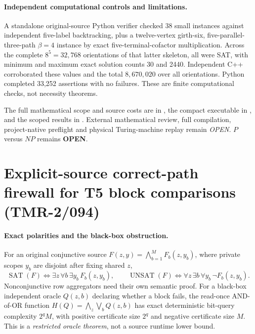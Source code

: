 \documentclass[11pt]{article}
\begin{document}
\paragraph{Independent computational controls and limitations.}
A standalone original-source Python verifier checked 38 small
instances against independent five-label backtracking,
plus a twelve-vertex girth-six, five-parallel-three-path
$\beta=4$ instance by exact five-terminal-cofactor multiplication.
Across the complete $8^5=32{,}768$ orientations of that latter
skeleton, all were SAT, with minimum and maximum exact solution
counts 30 and 2440. Independent C++ corroborated these values
and the total $8{,}670{,}020$ over all orientations.
Python completed 33,252 assertions with no failures.
These are finite computational checks, not necessity theorems.

The full mathematical scope and source costs are in
,
the compact executable in
,
and the scoped results in
.
External mathematical review, full compilation, project-native
preflight and physical Turing-machine replay remain \emph{OPEN}.
$P$ versus $NP$ remains \textbf{OPEN}.


\section{Explicit-source correct-path firewall for T5 block comparisons (TMR-2/094)}

\paragraph{Exact polarities and the black-box obstruction.}
For an original conjunctive source
$F(z,y)=\bigwedge_{b=1}^{M}F_b(z,y_b)$,
where private scopes $y_b$ are disjoint after fixing shared $z$,
\[
\operatorname{SAT}(F)\iff
  \exists z\,\forall b\,\exists y_b\,F_b(z,y_b),
\qquad
\operatorname{UNSAT}(F)\iff
  \forall z\,\exists b\,\forall y_b\,\neg F_b(z,y_b).
\]
Nonconjunctive row aggregators need their own semantic proof.
For a black-box independent oracle $Q(z,b)$ declaring
whether a block fails, the read-once AND-of-OR function
$H(Q)=\bigwedge_z\bigvee_b Q(z,b)$ has exact deterministic
bit-query complexity $2^q M$, with positive certificate
size $2^q$ and negative certificate size $M$.
This is a \emph{restricted oracle theorem}, not a source
runtime lower bound.
\end{document}
